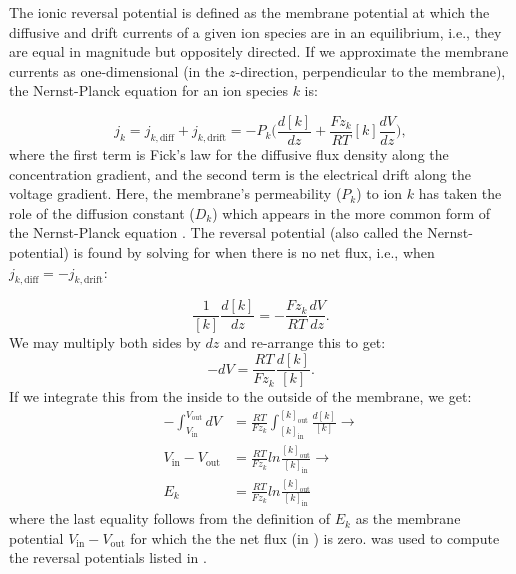 The ionic reversal potential  is defined as the membrane potential at which the diffusive and drift currents of a given ion species are in an equilibrium, i.e., they are equal in magnitude but oppositely directed. If we approximate the membrane currents as one-dimensional (in the $z$-direction, perpendicular to the membrane), the Nernst-Planck equation for an ion species $k$ is:

\begin{equation}
j_k = j_{k,\text{diff}} + j_{k,\text{drift}} 
=  - P_k \Big(\frac{d[k]}{dz} +  \frac{Fz_k}{RT}  [k] \frac{dV}{dz} \Big), 
\label{eq:Neuron:NP1D}
\end{equation}
where the first term is Fick's law for the diffusive flux density along the concentration gradient, and the second term is the electrical drift along the voltage gradient. Here, the membrane's permeability ($P_k$) to ion $k$ has taken the role of the diffusion constant ($D_k$) which appears in the more common form of the Nernst-Planck equation . The reversal potential (also called the Nernst-potential) is found by solving for when there is no net flux, i.e., when  $j_{k,\text{diff}} = - j_{k,\text{drift}}$:

\begin{equation}
\frac{1}{[k]} \frac{d[k]}{dz} = - \frac{Fz_k}{RT}  \frac{dV}{dz}.
\end{equation}
We may multiply both sides by $dz$ and re-arrange this to get:
\begin{equation}
-dV = \frac{RT}{Fz_k}  \frac{d[k]}{[k]}.
\end{equation}
If we integrate this from the inside to the outside of the membrane, we get:
\begin{align}
-\int_{V_{\text{in}}}^{V_{\text{out}}}  dV &= \frac{RT}{Fz_k}  \int_{[k]_{\text{in}}}^{[k]_{\text{out}}} \frac{d[k]}{[k]} \rightarrow \\
V_{\text{in}}-V_{\text{out}} &= \frac{RT}{Fz_k} ln \frac{[k]_{\text{out}}} {[k]_{\text{in}}} \rightarrow \\
E_k & =  \frac{RT}{Fz_k}  ln \frac{[k]_{\text{out}}} {[k]_{\text{in}}} 
\label{eq:Neuron:revpots}
\end{align}
where the last equality follows from the definition of $E_k$ as the membrane potential $V_{\text{in}}-V_{\text{out}}$ for which the the net flux (in ) is zero.  was used to compute the reversal potentials listed in . 

